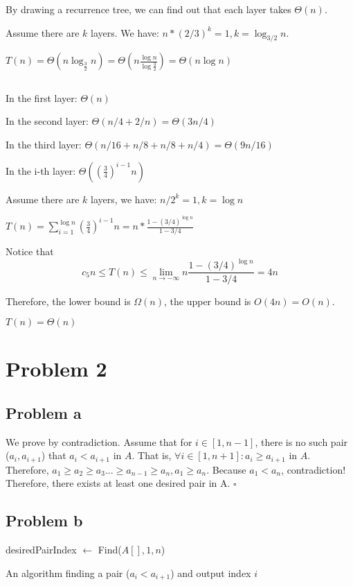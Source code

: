 \documentclass{article}
\begin{document}
By drawing a recurrence tree, we can find out that each layer takes $\Theta(n)$.

Assume there are $k$ layers. We have: $n*(2/3)^k=1, k = \log_{3/2}{n}$.

$T(n) = \Theta(n\log_{\frac{3}{2}}{n})=\Theta(n \frac{\log{n}
}{\log{\frac{3}{2}}})=\Theta(n\log{n})$

\subsection{}
In the first layer: $\Theta(n)$

In the second layer: $\Theta(n/4+2/n) = \Theta(3n/4)$

In the third layer: $\Theta(n/16+n/8+n/8+n/4)=\Theta(9n/16)$

In the i-th layer:
$\Theta((\frac{3}{4})^{i-1}n)$

Assume there are $k$ layers, we have: $n/{2^k}=1, k = \log{n}$

$T(n)=\sum_{i=1}^{\log{n}}(\frac{3}{4})^{i-1}n=n*\frac{1-(3/4)^{\log{n}}}{1-3/4}$

Notice that \[c_5n \leq T(n) \leq \lim_{n \to -\infty}n\frac{1-(3/4)^{\log{n}}}{1-3/4}=4n\]

Therefore, the lower bound is $\Omega(n)$, the upper bound is $O(4n)=O(n)$.

$T(n) = \Theta(n)$

\section{Problem 2}
\subsection{Problem a}
We prove by contradiction. Assume that for $i\in [1,n-1]$, there is no such pair ($a_i, a_{i+1}$) that $a_i < a_{i+1}$ in $A$. That is, $\forall i\in[1,n+1]: a_i \geq a_{i+1}$ in $A$. Therefore, $a_1 \geq a_2 \geq a_3 ... \geq a_{n-1} \geq a_{n}, a_1 \geq a_n$. Because $a_1 < a_n$, contradiction! Therefore, there exists at least one desired pair in A. $\square$
\subsection{Problem b}
\begin{algorithm}[!ht]
\DontPrintSemicolon
{}
    desiredPairIndex $\leftarrow$ Find($A[], 1,n$)
      \;

\caption{An algorithm finding a pair ($a_i < a_{i+1}$) and output index $i$}
\end{algorithm}
\end{document}
